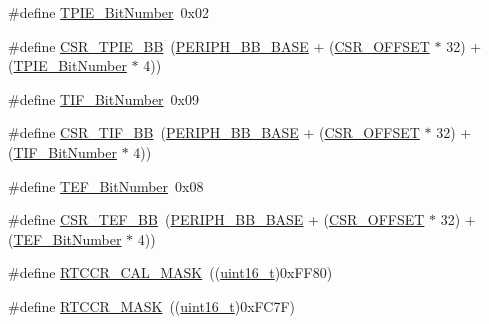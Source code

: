 \begin{DoxyCompactItemize}
\item 
\#define \hyperlink{group___b_k_p___private___defines_gac62e6ae9548498efa47fb72637545117}{T\+P\+I\+E\+\_\+\+Bit\+Number}~0x02
\item 
\#define \hyperlink{group___b_k_p___private___defines_ga1f6dcf729994613b21f554ca371d393c}{C\+S\+R\+\_\+\+T\+P\+I\+E\+\_\+\+BB}~(\hyperlink{openmotestm_2library_2inc_2stm32f10x__map_8h_aed7efc100877000845c236ccdc9e144a}{P\+E\+R\+I\+P\+H\+\_\+\+B\+B\+\_\+\+B\+A\+SE} + (\hyperlink{openmotestm_2library_2src_2stm32f10x__rcc_8c_a984cbe73312b6d3d355c5053763d499a}{C\+S\+R\+\_\+\+O\+F\+F\+S\+ET} $\ast$ 32) + (\hyperlink{openmotestm_2library_2src_2stm32f10x__bkp_8c_ac62e6ae9548498efa47fb72637545117}{T\+P\+I\+E\+\_\+\+Bit\+Number} $\ast$ 4))
\item 
\#define \hyperlink{group___b_k_p___private___defines_gac8b1b82c7029c05e720c50585762bcf2}{T\+I\+F\+\_\+\+Bit\+Number}~0x09
\item 
\#define \hyperlink{group___b_k_p___private___defines_ga8d9e7cac2321fae6d257e8c1316264e3}{C\+S\+R\+\_\+\+T\+I\+F\+\_\+\+BB}~(\hyperlink{openmotestm_2library_2inc_2stm32f10x__map_8h_aed7efc100877000845c236ccdc9e144a}{P\+E\+R\+I\+P\+H\+\_\+\+B\+B\+\_\+\+B\+A\+SE} + (\hyperlink{openmotestm_2library_2src_2stm32f10x__rcc_8c_a984cbe73312b6d3d355c5053763d499a}{C\+S\+R\+\_\+\+O\+F\+F\+S\+ET} $\ast$ 32) + (\hyperlink{openmotestm_2library_2src_2stm32f10x__bkp_8c_ac8b1b82c7029c05e720c50585762bcf2}{T\+I\+F\+\_\+\+Bit\+Number} $\ast$ 4))
\item 
\#define \hyperlink{group___b_k_p___private___defines_gaeb8676e7543d93df60cf7c63fd795672}{T\+E\+F\+\_\+\+Bit\+Number}~0x08
\item 
\#define \hyperlink{group___b_k_p___private___defines_gad60539cc791a26701d414aee529ea203}{C\+S\+R\+\_\+\+T\+E\+F\+\_\+\+BB}~(\hyperlink{openmotestm_2library_2inc_2stm32f10x__map_8h_aed7efc100877000845c236ccdc9e144a}{P\+E\+R\+I\+P\+H\+\_\+\+B\+B\+\_\+\+B\+A\+SE} + (\hyperlink{openmotestm_2library_2src_2stm32f10x__rcc_8c_a984cbe73312b6d3d355c5053763d499a}{C\+S\+R\+\_\+\+O\+F\+F\+S\+ET} $\ast$ 32) + (\hyperlink{openmotestm_2library_2src_2stm32f10x__bkp_8c_aeb8676e7543d93df60cf7c63fd795672}{T\+E\+F\+\_\+\+Bit\+Number} $\ast$ 4))
\item 
\#define \hyperlink{group___b_k_p___private___defines_ga61a540c5dd9d18e936b8fd3e01f7f6ff}{R\+T\+C\+C\+R\+\_\+\+C\+A\+L\+\_\+\+M\+A\+SK}~((\hyperlink{_p_e___types_8h_a1f1825b69244eb3ad2c7165ddc99c956}{uint16\+\_\+t})0x\+F\+F80)
\item 
\#define \hyperlink{group___b_k_p___private___defines_ga4bda91755d5ae28e9e487e946917a1ec}{R\+T\+C\+C\+R\+\_\+\+M\+A\+SK}~((\hyperlink{_p_e___types_8h_a1f1825b69244eb3ad2c7165ddc99c956}{uint16\+\_\+t})0x\+F\+C7\+F)
\end{DoxyCompactItemize}
